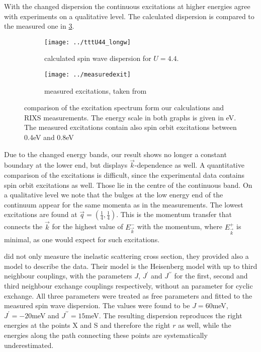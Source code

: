 With the changed dispersion the continuous excitations at higher energies agree with experiments on a qualitative level. 
The calculated dispersion is compared to the measured one in \ref{continuum}.
\begin{figure}
 \centering
 \begin{subfigure}{0.49\linewidth}
  \texttt{[image: ../tttU44\_longw]}
  \caption{calculated spin wave dispersion for $U=4.4$.}
  \label{tttU44_longw}
 \end{subfigure}
\begin{subfigure}{.49\linewidth}
 \texttt{[image: ../measuredexit]}
 \caption{measured excitations, taken from \cite{PhysRevLett.108.177003} }
 \label{experimental_longw}
\end{subfigure}
\caption{comparison of the excitation spectrum  form our calculations and RIXS measurements. The energy scale in both graphs is given in eV. 
	  The measured excitations contain also spin orbit excitations between 0.4eV and 0.8eV}
\label{continuum}	  
\end{figure}
Due to the changed energy bands, our result shows no longer a constant boundary at the lower end, but displays $\vec k$-dependence as well.
A quantitative comparison of the excitations is difficult, since the experimental data contains  spin orbit excitations as well. Those lie in the centre 
of the continuous band.
On a qualitative level we note that the bulges at the low energy end of the continuum  appear for the same momenta as in the measurements. 
The lowest excitations are found at $\vec q = (\frac14,\frac14)$. This is the momentum transfer that connects the $\vec k$ for the highest value of $E^-_{\vec k}$ with the 
momentum, where $E^+_{\vec k}$ is minimal, as one would expect for such excitations.








\citet{PhysRevLett.108.177003} did not only measure the inelastic scattering cross section, they provided also a model to describe the data.
Their model is the Heisenberg model with up to third neighbour couplings, with the parameters $J$, $J^{\prime}$ and $J^{\prime \prime}$ for
the first, second and third neighbour exchange couplings respectively, without an parameter for cyclic exchange. 
All three parameters were treated as free parameters and fitted to the measured spin wave dispersion. 
The values were found to be $J=60$meV, $J^{\prime}=-20$meV and $J^{\prime\prime}=15$meV. 
The resulting dispersion reproduces the right energies at the points X and S and therefore the right $r$ as well,
while the energies along the path connecting these points are systematically underestimated.



